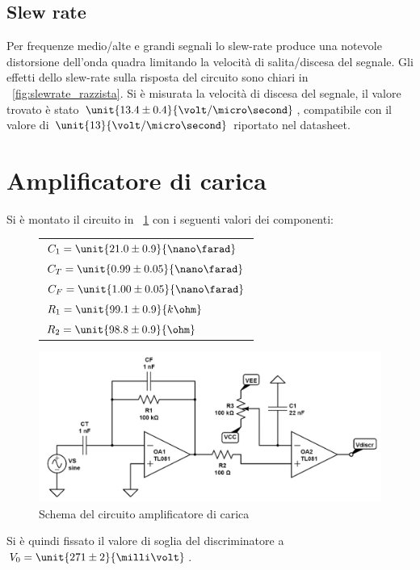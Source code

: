 \documentclass[10pt,a4paper]{article}
\begin{document}
\subsection{Slew rate}
Per frequenze medio/alte e grandi segnali lo slew-rate produce una notevole distorsione dell'onda quadra limitando la velocità di salita/discesa del segnale. Gli effetti dello slew-rate sulla risposta del circuito sono chiari in \figurename{~\ref{fig:slewrate_razzista}}. Si è misurata la velocità di discesa del segnale, il valore trovato è stato $\unit{13.4 \pm 0.4}{\volt /\micro\second}$, compatibile con il valore di $\unit{13}{\volt / \micro\second}$ riportato nel datasheet.

\section{Amplificatore di carica}

Si è montato il circuito in \figurename{~\ref{circuio_ampli}} con i seguenti valori dei componenti:

\begin{figure}[H]
	\begin{minipage}{0.3\textwidth}
		\centering
		\begin{tabular}{l}
			$C_1 = \unit{21.0 \pm 0.9}{\nano\farad}$  \\ 
			$C_T = \unit{0.99 \pm 0.05}{\nano\farad}$ \\
			$C_F = \unit{1.00 \pm 0.05}{\nano\farad}$ \\
			$R_1 = \unit{99.1 \pm 0.9}{k\ohm}$  \\
			$R_2 = \unit{98.8 \pm 0.9}{\ohm}$
		\end{tabular}
	\end{minipage}
	\begin{minipage}{0.7\textwidth}
		\centering
		\includegraphics[width=\textwidth]{../circuiti/charge_amplifier.jpg}
		\caption{Schema del circuito amplificatore di carica}
		\label{circuio_ampli}
	\end{minipage}
\end{figure}
 Si è quindi fissato il valore di soglia del discriminatore a $V_0 = \unit{271 \pm 2}{\milli\volt}$.
\end{document}
